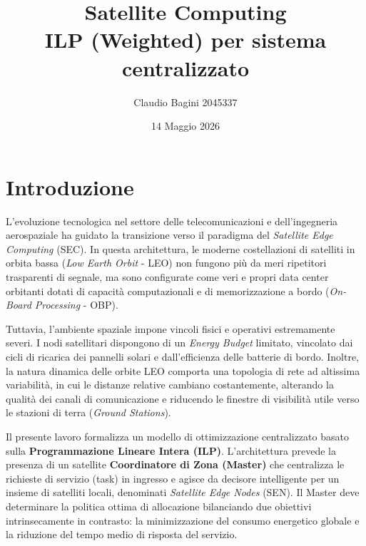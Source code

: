 \documentclass[12pt]{article}
\title{
\textbf{Satellite Computing} \\[0.5em]
\textbf{ILP (Weighted) per sistema centralizzato} \\[1em]
}
\author{Claudio Bagini 2045337}
\date{14 Maggio 2026}
\begin{document}
\maketitle


\section{Introduzione}

L'evoluzione tecnologica nel settore delle telecomunicazioni e dell'ingegneria aerospaziale ha guidato la transizione verso il paradigma del \textit{Satellite Edge Computing} (SEC). In questa architettura, le moderne costellazioni di satelliti in orbita bassa (\textit{Low Earth Orbit} - LEO) non fungono pi\`u da meri ripetitori trasparenti di segnale, ma sono configurate come veri e propri data center orbitanti dotati di capacit\`a computazionali e di memorizzazione a bordo (\textit{On-Board Processing} - OBP).

Tuttavia, l'ambiente spaziale impone vincoli fisici e operativi estremamente severi. I nodi satellitari dispongono di un \textit{Energy Budget} limitato, vincolato dai cicli di ricarica dei pannelli solari e dall'efficienza delle batterie di bordo. Inoltre, la natura dinamica delle orbite LEO comporta una topologia di rete ad altissima variabilit\`a, in cui le distanze relative cambiano costantemente, alterando la qualit\`a dei canali di comunicazione e riducendo le finestre di visibilit\`a utile verso le stazioni di terra (\textit{Ground Stations}).

Il presente lavoro formalizza un modello di ottimizzazione centralizzato basato sulla \textbf{Programmazione Lineare Intera (ILP)}. L'architettura prevede la presenza di un satellite \textbf{Coordinatore di Zona (Master)} che centralizza le richieste di servizio (task) in ingresso e agisce da decisore intelligente per un insieme di satelliti locali, denominati \textit{Satellite Edge Nodes} (SEN). Il Master deve determinare la politica ottima di allocazione bilanciando due obiettivi intrinsecamente in contrasto: la minimizzazione del consumo energetico globale e la riduzione del tempo medio di risposta del servizio.
\end{document}
